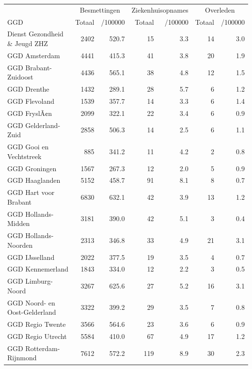 \documentclass[
  english,
  man,floatsintext]{apa6}
\begin{document}
\begin{table}
\centering\begingroup\fontsize{10}{12}\selectfont

\begin{threeparttable}
\begin{tabular}{lrrrrrr}
\toprule
\multicolumn{1}{c}{ } & \multicolumn{2}{c}{Besmettingen} & \multicolumn{2}{c}{Ziekenhuisopnames} & \multicolumn{2}{c}{Overleden} \\
\cmidrule(l{3pt}r{3pt}){2-3} \cmidrule(l{3pt}r{3pt}){4-5} \cmidrule(l{3pt}r{3pt}){6-7}
GGD & Totaal & /100000 & Totaal & /100000 & Totaal & /100000\\
\midrule
Dienst Gezondheid \& Jeugd ZHZ & 2402 & 520.7 & 15 & 3.3 & 14 & 3.0\\
GGD Amsterdam & 4441 & 415.3 & 41 & 3.8 & 20 & 1.9\\
GGD Brabant-Zuidoost & 4436 & 565.1 & 38 & 4.8 & 12 & 1.5\\
GGD Drenthe & 1432 & 289.1 & 28 & 5.7 & 6 & 1.2\\
GGD Flevoland & 1539 & 357.7 & 14 & 3.3 & 6 & 1.4\\
GGD FryslÃ¢n & 2099 & 322.1 & 22 & 3.4 & 6 & 0.9\\
GGD Gelderland-Zuid & 2858 & 506.3 & 14 & 2.5 & 6 & 1.1\\
GGD Gooi en Vechtstreek & 885 & 341.2 & 11 & 4.2 & 2 & 0.8\\
GGD Groningen & 1567 & 267.3 & 12 & 2.0 & 5 & 0.9\\
GGD Haaglanden & 5152 & 458.7 & 91 & 8.1 & 8 & 0.7\\
GGD Hart voor Brabant & 6830 & 632.1 & 42 & 3.9 & 13 & 1.2\\
GGD Hollands-Midden & 3181 & 390.0 & 42 & 5.1 & 3 & 0.4\\
GGD Hollands-Noorden & 2313 & 346.8 & 33 & 4.9 & 21 & 3.1\\
GGD IJsselland & 2022 & 377.5 & 19 & 3.5 & 4 & 0.7\\
GGD Kennemerland & 1843 & 334.0 & 12 & 2.2 & 3 & 0.5\\
GGD Limburg-Noord & 3267 & 625.6 & 27 & 5.2 & 16 & 3.1\\
GGD Noord- en Oost-Gelderland & 3322 & 399.2 & 29 & 3.5 & 7 & 0.8\\
GGD Regio Twente & 3566 & 564.6 & 23 & 3.6 & 6 & 0.9\\
GGD Regio Utrecht & 5584 & 410.0 & 67 & 4.9 & 17 & 1.2\\
GGD Rotterdam-Rijnmond & 7612 & 572.2 & 119 & 8.9 & 30 & 2.3\\

\end{tabular}
\end{threeparttable}
\end{table}
\end{document}
